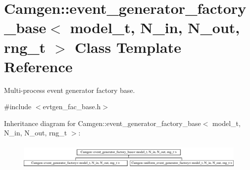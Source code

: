 \hypertarget{a00214}{}\section{Camgen\+:\+:event\+\_\+generator\+\_\+factory\+\_\+base$<$ model\+\_\+t, N\+\_\+in, N\+\_\+out, rng\+\_\+t $>$ Class Template Reference}
\label{a00214}


Multi-\/process event generator factory base.  




{\ttfamily \#include $<$evtgen\+\_\+fac\+\_\+base.\+h$>$}

Inheritance diagram for Camgen\+:\+:event\+\_\+generator\+\_\+factory\+\_\+base$<$ model\+\_\+t, N\+\_\+in, N\+\_\+out, rng\+\_\+t $>$\+:\begin{figure}[H]
\begin{center}
\leavevmode
\includegraphics[height=1.264108cm]{a00214}
\end{center}
\end{figure}
